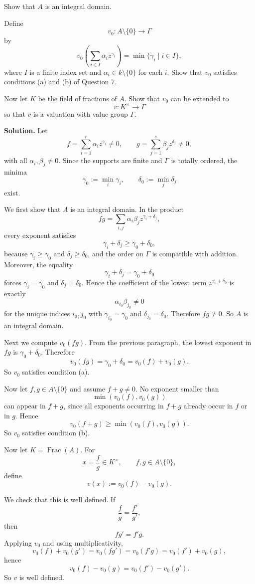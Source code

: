 \documentclass[12pt,a4paper]{article}
\theoremstyle{plain}
\theoremstyle{definition}      %
\begin{document}
Show that \(A\) is an integral domain.

Define
\[
v_0:A\setminus\{0\}\to \Gamma
\]
by
\[
v_0\!\left(\sum_{i\in I}\alpha_i z^{\gamma_i}\right)=\min\{\gamma_i\mid i\in I\},
\]
where \(I\) is a finite index set and \(\alpha_i\in k\setminus\{0\}\) for each \(i\). Show that \(v_0\) satisfies conditions (a) and (b) of Question 7.

Now let \(K\) be the field of fractions of \(A\). Show that \(v_0\) can be extended to
\[
v:K^\times\to \Gamma
\]
so that \(v\) is a valuation with value group \(\Gamma\).

\textbf{Solution.}
Let
\[
f=\sum_{i=1}^r \alpha_i z^{\gamma_i}\neq 0,\qquad
g=\sum_{j=1}^s \beta_j z^{\delta_j}\neq 0,
\]
with all \(\alpha_i,\beta_j\neq 0\). Since the supports are finite and \(\Gamma\) is totally ordered, the minima
\[
\gamma_0:=\min_i\gamma_i,\qquad \delta_0:=\min_j\delta_j
\]
exist.

We first show that \(A\) is an integral domain. In the product
\[
fg=\sum_{i,j}\alpha_i\beta_j z^{\gamma_i+\delta_j},
\]
every exponent satisfies
\[
\gamma_i+\delta_j\ge \gamma_0+\delta_0,
\]
because \(\gamma_i\ge \gamma_0\) and \(\delta_j\ge \delta_0\), and the order on \(\Gamma\) is compatible with addition. Moreover, the equality
\[
\gamma_i+\delta_j=\gamma_0+\delta_0
\]
forces \(\gamma_i=\gamma_0\) and \(\delta_j=\delta_0\). Hence the coefficient of the lowest term \(z^{\gamma_0+\delta_0}\) is exactly
\[
\alpha_{i_0}\beta_{j_0}\neq 0
\]
for the unique indices \(i_0,j_0\) with \(\gamma_{i_0}=\gamma_0\) and \(\delta_{j_0}=\delta_0\). Therefore \(fg\neq 0\). So \(A\) is an integral domain.

Next we compute \(v_0(fg)\). From the previous paragraph, the lowest exponent in \(fg\) is \(\gamma_0+\delta_0\). Therefore
\[
v_0(fg)=\gamma_0+\delta_0=v_0(f)+v_0(g).
\]
So \(v_0\) satisfies condition (a).

Now let \(f,g\in A\setminus\{0\}\) and assume \(f+g\neq 0\). No exponent smaller than
\[
\min(v_0(f),v_0(g))
\]
can appear in \(f+g\), since all exponents occurring in \(f+g\) already occur in \(f\) or in \(g\). Hence
\[
v_0(f+g)\ge \min(v_0(f),v_0(g)).
\]
So \(v_0\) satisfies condition (b).

Now let \(K=\operatorname{Frac}(A)\). For
\[
x=\frac{f}{g}\in K^\times,\qquad f,g\in A\setminus\{0\},
\]
define
\[
v(x):=v_0(f)-v_0(g).
\]

We check that this is well defined. If
\[
\frac{f}{g}=\frac{f'}{g'},
\]
then
\[
fg'=f'g.
\]
Applying \(v_0\) and using multiplicativity,
\[
v_0(f)+v_0(g')=v_0(fg')=v_0(f'g)=v_0(f')+v_0(g),
\]
hence
\[
v_0(f)-v_0(g)=v_0(f')-v_0(g').
\]
So \(v\) is well defined.
\end{document}
